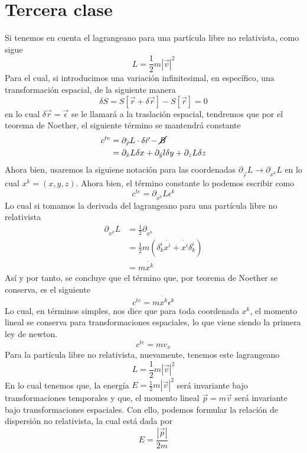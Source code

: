 \documentclass[../main.tex]{subfiles}
\begin{document}
\section{Tercera clase}
Si tenemos en cuenta el lagrangeano para una partícula libre no relativista, como sigue
\begin{equation}
    L=\frac{1}{2}m|\vec{v}|^2
\end{equation}
Para el cual, si introducimos una variación infinitesimal, en específico, una transformación espacial, de la siguiente manera
\begin{equation}
    \delta S= S[\vec{r}+\delta \vec{r}] - S[\vec{r}]=0
\end{equation}
en lo cual $\delta\vec{r}=\vec{\epsilon}$ se le llamará a la traslación espacial, tendremos que por el teorema de Noether, el siguiente término se mantendrá constante
\begin{align}
    c^{te} &=\partial_{\dot{\vec{r}}} L \cdot \delta \vec{r} - \cancel{B} \\
    & = \partial_{\dot{x}}L \delta x + \partial_{\dot{y}}l \delta y + \partial_{z}L\delta z
\end{align}
Ahora bien, usaremos la siguiene notación para las coordenadas $\partial_{\dot{\vec{r}}}L \xrightarrow{}\partial_{\dot{x^k}}L $ en lo cual $x^k=(x,y,z)$. Ahora bien, el término constante lo podemos escribir como
\begin{equation}
    c^{te}=\partial_{\dot{x^k}}L \epsilon^k
\end{equation}
Lo cual si tomamos la derivada del lagrangeano para una partícula libre no relativista
\begin{align}
    \partial_{\dot{x^k}}L & =\frac{1}{2} \partial_{\dot{x^k}} \\
    & = \frac{1}{2}m (\delta_k^i \dot{x^i} + \dot{x^i}\delta_k^i) \\
    & = m\dot{x^k}
\end{align}
Así y por tanto, se concluye que el término que, por teorema de Noether se conserva, es el siguiente
\begin{equation}
    c^{te}=m\dot{x^k}\epsilon^k
\end{equation}
Lo cual, en términos simples, nos dice que para toda coordenada $x^k$, el momento lineal se conserva para transformaciones espaciales, lo que viene siendo la primera ley de newton.
\begin{equation}
    c^{te}=mv_x
\end{equation}
Para la partícula libre no relativista, nuevamente, tenemos este lagrangeano
\begin{equation}
    L=\frac{1}{2}m|\vec{v}|^2
\end{equation}
En lo cual tenemos que, la energía $E=\frac{1}{2}m|\vec{v}|^2$ será invariante bajo transformaciones temporales y que, el momento lineal $\vec{p}=m\vec{v}$ será invariante bajo transformaciones espaciales. Con ello, podemos formular la relación de dispersión no relativista, la cual está dada por
\begin{equation}
    E=\frac{|\vec{p}|}{2m}
\end{equation}
\end{document}
